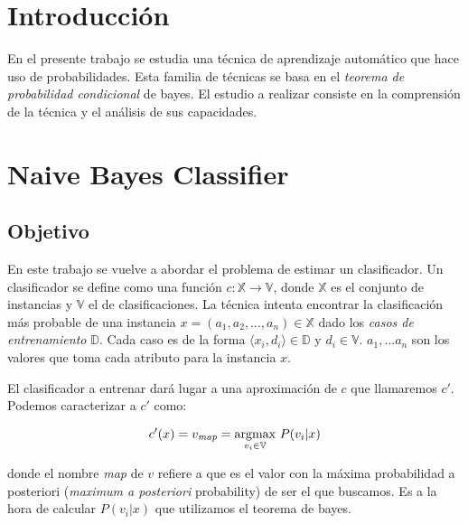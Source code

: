\documentclass[a4paper,10pt]{article}
\begin{document}



\maketitle
\tableofcontents
\newpage

\section{Introducción}

En el presente trabajo se estudia una técnica de aprendizaje automático que hace uso de probabilidades. Esta familia de técnicas se basa en el \emph{teorema de probabilidad condicional} de bayes. El estudio a realizar consiste en la comprensión de la técnica y el análisis de sus capacidades.

\section{Naive Bayes Classifier}

\subsection{Objetivo}

En este trabajo se vuelve a abordar el problema de estimar un clasificador. Un clasificador se define como una función $c : \mathbb{X} \rightarrow \mathbb{V}$, donde $\mathbb{X}$ es el conjunto de instancias y $\mathbb{V}$ el de clasificaciones. La técnica intenta encontrar la clasificación más probable de una instancia $x = (a_1, a_2, \dots, a_n) \in \mathbb{X}$ dado los \emph{casos de entrenamiento} $\mathbb{D}$. Cada caso es de la forma $\langle x_i, d_i \rangle \in \mathbb{D}$ y $d_i \in \mathbb{V}$. $a_1, \dots a_n$ son los valores que toma cada atributo para la instancia $x$.

El clasificador a entrenar dará lugar a una aproximación de $c$ que llamaremos $c'$. Podemos caracterizar a $c'$ como: 

\begin{equation}\label{eq_vmap}
c'(x) = v_{\text{\emph{map}}} = \underset{v_i \in \mathbb{V}}{\text{argmax}}\  P(v_i | x) 
\end{equation}

donde el nombre \emph{map} de $v$ refiere a que es el valor con la máxima probabilidad a posteriori (\emph{maximum a posteriori} probability) de ser el que buscamos. Es a la hora de calcular $P(v_i | x)$ que utilizamos el teorema de bayes.
\end{document}
